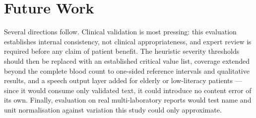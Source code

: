 \documentclass{svproc}
\begin{document}
\section{Future Work}

Several directions follow. Clinical validation is most pressing: this
evaluation establishes internal consistency, not clinical appropriateness,
and expert review is required before any claim of patient benefit. The
heuristic severity thresholds should then be replaced with an established
critical value list, coverage extended beyond the complete blood count to
one-sided reference intervals and qualitative results, and a speech output
layer added for elderly or low-literacy patients --- since it would
consume only validated text, it could introduce no content error of its
own. Finally, evaluation on real multi-laboratory reports would test name
and unit normalisation against variation this study could only
approximate.



{\renewcommand{\small}{\fontsize{8}{9.6}\selectfont}


}
\end{document}
